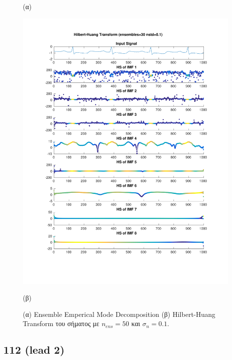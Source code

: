 \documentclass[11pt,a4paper]{article}
\begin{document}
\begin{figure}[H]
\begin{minipage}{0.48\textwidth}
	(α)
\end{minipage}
\begin{minipage}{0.48\textwidth}
	\centering
	\includegraphics[width=\textwidth]{fig/112l1_hht_ensemble.pdf}
	
	(β)
\end{minipage}
\vfill
\caption{(α) Ensemble Emperical Mode Decomposition (β) Hilbert-Huang Transform του σήματος με $n_{ens}=50$ και $\sigma_n = 0.1$.}
\label{fig:112l1_hht_ensemble}
\end{figure}

\subsection*{112 (lead 2)}
\end{document}
